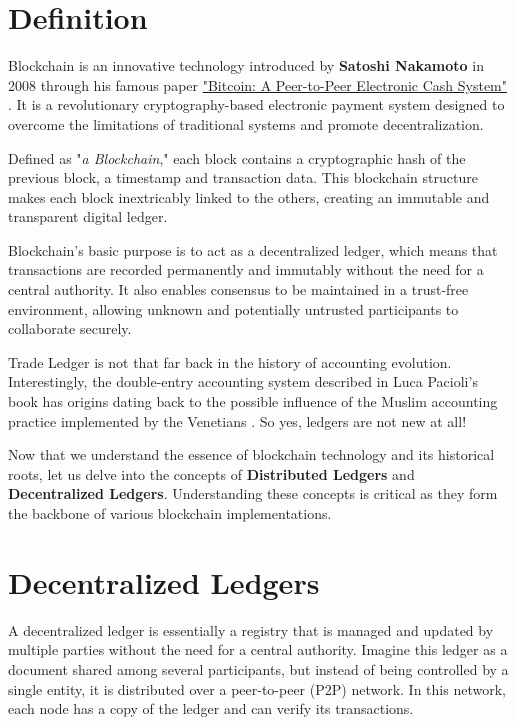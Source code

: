 \section{Definition}

Blockchain is an innovative technology introduced by \textbf{Satoshi Nakamoto} in 2008 through his famous paper \href{https://bitcoin.org/bitcoin.pdf}{"Bitcoin: A Peer-to-Peer Electronic Cash System"} \cite{bitcoinSatoshi}. It is a revolutionary cryptography-based electronic payment system designed to overcome the limitations of traditional systems and promote decentralization.

\begin{remark}
Defined as "\textit{a Blockchain}," each block contains a cryptographic hash of the previous block, a timestamp and transaction data. This blockchain structure makes each block inextricably linked to the others, creating an immutable and transparent digital ledger.
\end{remark}

Blockchain's basic purpose is to act as a decentralized ledger, which means that transactions are recorded permanently and immutably without the need for a central authority. It also enables consensus to be maintained in a trust-free environment, allowing unknown and potentially untrusted participants to collaborate securely.

Trade Ledger is not that far back in the history of accounting evolution. Interestingly, the double-entry accounting system described in Luca Pacioli's book has origins dating back to the possible influence of the Muslim accounting practice implemented by the Venetians \cite{accountingBooks}. So yes, ledgers are not new at all!

Now that we understand the essence of blockchain technology and its historical roots, let us delve into the concepts of \textbf{Distributed Ledgers} and \textbf{Decentralized Ledgers}. Understanding these concepts is critical as they form the backbone of various blockchain implementations.

\section{Decentralized Ledgers}
A decentralized ledger is essentially a registry that is managed and updated by multiple parties without the need for a central authority. Imagine this ledger as a document shared among several participants, but instead of being controlled by a single entity, it is distributed over a peer-to-peer (P2P) network. In this network, each node has a copy of the ledger and can verify its transactions.

